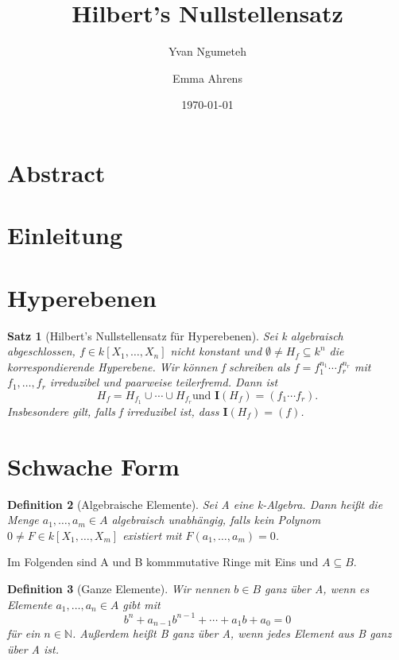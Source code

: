 \documentclass{article}
\title{Hilbert's Nullstellensatz}
\date{\today}
\author{Yvan Ngumeteh \and Emma Ahrens}
\newtheorem{satz}{Satz}
\newtheorem{definition}[satz]{Definition}
\begin{document}
\maketitle

\section{Abstract}
\section{Einleitung}
\section{Hyperebenen}
	
	\begin{satz}[Hilbert's Nullstellensatz für Hyperebenen]
	Sei k algebraisch abgeschlossen, \(f \in k[X_1,\ldots,X_n]\) nicht
	konstant und \(\emptyset \neq H_f \subseteq k^n\) die korrespondierende
	Hyperebene. Wir können f schreiben als \(f = f_1^{n_1}\cdots f_r^{n_r}\)
	mit \(f_1,\ldots,f_r\) irreduzibel und paarweise teilerfremd. Dann ist
	\begin{displaymath} H_f = H_{f_1} \cup \cdots \cup H_{f_r} \text{und }
	\mathbf{I}(H_f) = (f_1\cdots f_r). \end{displaymath}
	Insbesondere gilt, falls f irreduzibel ist, dass \(\mathbf{I}(H_f) = (f)\).
	\end{satz}

\section{Schwache Form}

	\begin{definition}[Algebraische Elemente]
	Sei A eine k-Algebra. Dann heißt die Menge \(a_1,\ldots, a_m \in A\)
	algebraisch unabhängig, falls kein Polynom \(0 \neq F \in k[X_1,\ldots,X_m]
	\) existiert mit \(F(a_1,\ldots,a_m) = 0\).
	\end{definition}

	Im Folgenden sind A und B kommmutative Ringe mit Eins und \(A \subseteq B\).

	\begin{definition}[Ganze Elemente]
	Wir nennen \(b \in B\) ganz über A, wenn es Elemente \(a_1, \ldots, a_n \in
	A\) gibt mit
	\begin{displaymath} b^n + a_{n-1}b^{n-1} + \cdots + a_1b + a_0 = 0
	\end{displaymath} für ein \(n \in \mathbb{N}\).
	Außerdem heißt B ganz über A, wenn jedes Element aus B ganz über A ist.
	\end{definition}
\end{document}
